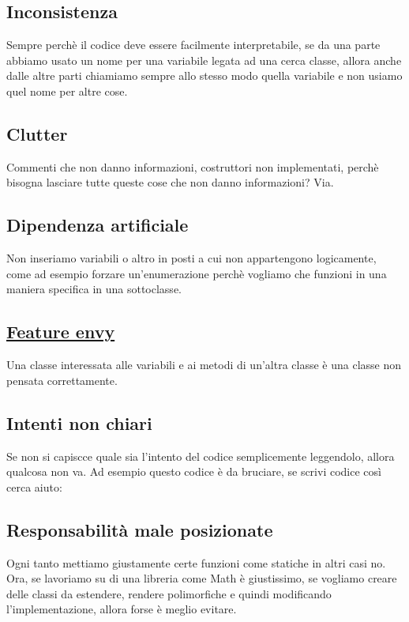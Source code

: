 \documentclass[11pt,a4paper]{book}
\begin{document}
\subsection{Inconsistenza}
Sempre perchè il codice deve essere facilmente interpretabile, se da una parte abbiamo usato un nome per una variabile legata ad una cerca classe, allora anche dalle altre parti chiamiamo sempre allo stesso modo quella variabile e non usiamo quel nome per altre cose.

\subsection{Clutter}
Commenti che non danno informazioni, costruttori non implementati, perchè bisogna lasciare tutte queste cose che non danno informazioni? Via.

\subsection{Dipendenza artificiale}
Non inseriamo variabili o altro in posti a cui non appartengono logicamente, come ad esempio forzare un'enumerazione perchè vogliamo che funzioni in una maniera specifica in una sottoclasse. 

\subsection{\href{https://refactoring.guru/smells/feature-envy}{Feature envy}}
Una classe interessata alle variabili e ai metodi di un'altra classe è una classe non pensata correttamente.

\subsection{Intenti non chiari}
Se non si capiscce quale sia l'intento del codice semplicemente leggendolo, allora qualcosa non va. Ad esempio questo codice è da bruciare, se scrivi codice così cerca aiuto:
\label{code: 066}

\subsection{Responsabilità male posizionate}
Ogni tanto mettiamo giustamente certe funzioni come statiche in altri casi no. Ora, se lavoriamo su di una libreria come Math è giustissimo, se vogliamo creare delle classi da estendere, rendere polimorfiche e quindi modificando l'implementazione, allora forse è meglio evitare.
\end{document}
